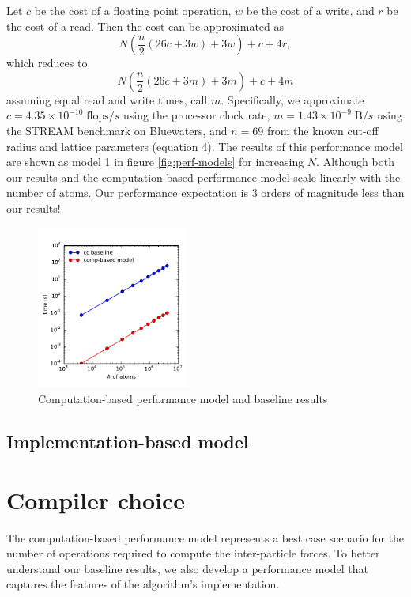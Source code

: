 \documentclass[12pt]{article}
\begin{document}
\noindent Let $c$ be the cost of a floating point operation, $w$ be the cost of a write, 
and $r$ be the cost of a read. Then the cost can be approximated as
\begin{equation}
    N \left(\frac{n}{2} \left(26 c + 3 w\right) + 3 w\right) + c + 4 r,
\end{equation}
which reduces to
\begin{equation}
  N \left(\frac{n}{2} \left(26 c + 3 m\right) + 3 m\right) + c + 4 m
  \label{eqn:perf-model}
\end{equation}
assuming equal read and write times, call $m$. Specifically, we approximate
$c = 4.35\times10^{-10}\;\text{flops}/s$ using the processor clock rate, 
$m = 1.43\times10^{-9}\;\text{B}/s$ using the STREAM benchmark on Bluewaters,
and $n = 69$ from the known cut-off radius and lattice parameters (equation 4).
The results of this performance model are shown as model 1 in figure 
\ref{fig:perf-models} for increasing $N$. Although both our results and the 
computation-based performance model scale linearly with the number of atoms. 
Our performance expectation is 3 orders of magnitude less than our results!

\begin{figure}[h!]
  \centering
  \includegraphics[width=0.45\textwidth]{../figs/perfmodel_forceLJ.pdf}
  \caption{Computation-based performance model and baseline results}
\end{figure}


\subsection{Implementation-based model}
\section{Compiler choice}
The computation-based performance model represents a best case scenario 
for the number of operations required to compute the inter-particle forces. 
To better understand our baseline results, we also develop a performance model 
that captures the features of the algorithm's implementation. \\
\end{document}
